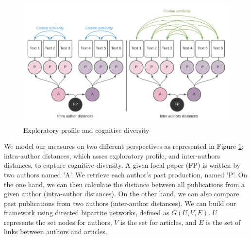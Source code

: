     
        
    \begin{figure}[H]
      \centering
      \includegraphics[width=\textwidth]{2_chapter2/figures/Author_proximity.png}
      \caption[Exploratory profile and cognitive diversity]{Exploratory profile and cognitive diversity}
      \label{figure:indicators}
    \end{figure} 
    
        We model our measures on two different perspectives as represented in Figure \ref{figure:indicators}: intra-author distances, which asses exploratory profile, and inter-authors distances, to capture cognitive diversity. A given focal paper (FP) is written by two authors named 'A'. We retrieve each author's past production, named 'P'. On the one hand, we can then calculate the distance between all publications from a given author (intra-author distances). On the other hand, we can also compare past publications from two authors (inter-author distances). We can build our framework using directed bipartite networks, defined as $G(U,V,E)$. $U$ represents the set nodes for authors, $V$ is the set for articles, and $E$ is the set of links between authors and articles.
        
        
